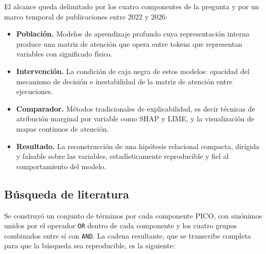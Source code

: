 El alcance queda delimitado por los cuatro componentes de la pregunta y por un marco temporal de publicaciones entre 2022 y 2026:

\begin{itemize}[itemsep=1pt]
\item \textbf{Población.} Modelos de aprendizaje profundo cuya representación interna produce una matriz de atención que opera entre tokens que representan variables con significado físico.
\item \textbf{Intervención.} La condición de caja negra de estos modelos: opacidad del mecanismo de decisión e inestabilidad de la matriz de atención entre ejecuciones.
\item \textbf{Comparador.} Métodos tradicionales de explicabilidad, es decir técnicas de atribución marginal por variable como SHAP y LIME, y la visualización de mapas continuos de atención.
\item \textbf{Resultado.} La reconstrucción de una hipótesis relacional compacta, dirigida y falsable sobre las variables, estadísticamente reproducible y fiel al comportamiento del modelo.
\end{itemize}

\subsection{Búsqueda de literatura}
\label{subsec:busqueda}

Se construyó un conjunto de términos por cada componente PICO, con sinónimos unidos por el operador \texttt{OR} dentro de cada componente y los cuatro grupos combinados entre sí con \texttt{AND}. La cadena resultante, que se transcribe completa para que la búsqueda sea reproducible, es la siguiente:

